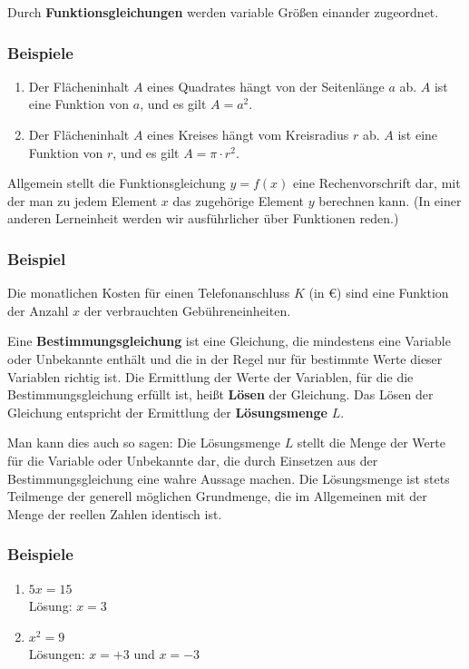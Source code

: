 Durch \textbf{Funktionsgleichungen} werden variable Größen einander zugeordnet.

\subsubsection{Beispiele}

\begin{enumerate}[label=\alph*)]
  \item Der Flächeninhalt $A$ eines Quadrates hängt von der Seitenlänge $a$ ab. $A$ ist eine Funktion von $a$, und es gilt $A = a^2$.
  \item Der Flächeninhalt $A$ eines Kreises hängt vom Kreisradius $r$ ab. $A$ ist eine Funktion von $r$, und es gilt $A = \pi \cdot r^2$.\beispielende
\end{enumerate}

Allgemein stellt die Funktionsgleichung $y = f(x)$ eine Rechenvorschrift dar, mit der man zu jedem Element $x$ das zugehörige Element $y$ berechnen kann. (In einer anderen Lerneinheit werden wir ausführlicher über Funktionen reden.)

\subsubsection{Beispiel}

Die monatlichen Kosten für einen Telefonanschluss $K$ (in €) sind eine Funktion der Anzahl $x$ der verbrauchten Gebühreneinheiten.\beispielende

Eine \textbf{Bestimmungsgleichung} ist eine Gleichung, die mindestens eine Variable oder Unbekannte enthält und die in der Regel nur für bestimmte Werte dieser Variablen richtig ist. Die Ermittlung der Werte der Variablen, für die die Bestimmungsgleichung erfüllt ist, heißt \textbf{Lösen} der Gleichung. Das Lösen der Gleichung entspricht der Ermittlung der \textbf{Lösungsmenge} $L$.

Man kann dies auch so sagen: Die Lösungsmenge $L$ stellt die Menge der Werte für die Variable oder Unbekannte dar, die durch Einsetzen aus der Bestimmungsgleichung eine wahre Aussage machen. Die Lösungsmenge ist stets Teilmenge der generell möglichen Grundmenge, die im Allgemeinen mit der Menge der reellen Zahlen identisch ist.

\subsubsection{Beispiele}

\begin{enumerate}[label=\alph*)]
  \item $5x = 15$\\
    Lösung: $x = 3$
  \item $x^2 = 9$\\
    Lösungen: $x = +3$ und $x = -3$\beispielende
\end{enumerate}

